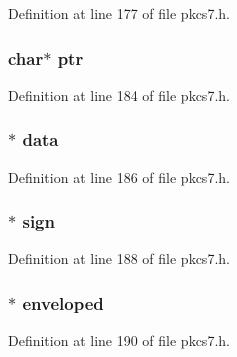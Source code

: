 Definition at line 177 of file pkcs7.\+h.

\subsubsection[{\texorpdfstring{ptr}{ptr}}]{\setlength{\rightskip}{0pt plus 5cm}char$\ast$ ptr}\hypertarget{structpkcs7__st_a935adc2e417a61d7eb6f04efb18ba031}{}\label{structpkcs7__st_a935adc2e417a61d7eb6f04efb18ba031}


Definition at line 184 of file pkcs7.\+h.

\subsubsection[{\texorpdfstring{data}{data}}]{$\ast$ data}\hypertarget{structpkcs7__st_ad912ad9a7275eda123accbf6fbdc5daa}{}\label{structpkcs7__st_ad912ad9a7275eda123accbf6fbdc5daa}


Definition at line 186 of file pkcs7.\+h.

\subsubsection[{\texorpdfstring{sign}{sign}}]{$\ast$ sign}\hypertarget{structpkcs7__st_a8129d85937f7a208c7940fa6033cfef9}{}\label{structpkcs7__st_a8129d85937f7a208c7940fa6033cfef9}


Definition at line 188 of file pkcs7.\+h.

\subsubsection[{\texorpdfstring{enveloped}{enveloped}}]{$\ast$ enveloped}\hypertarget{structpkcs7__st_addfc85f45fb2c64da554631a518cb320}{}\label{structpkcs7__st_addfc85f45fb2c64da554631a518cb320}


Definition at line 190 of file pkcs7.\+h.

